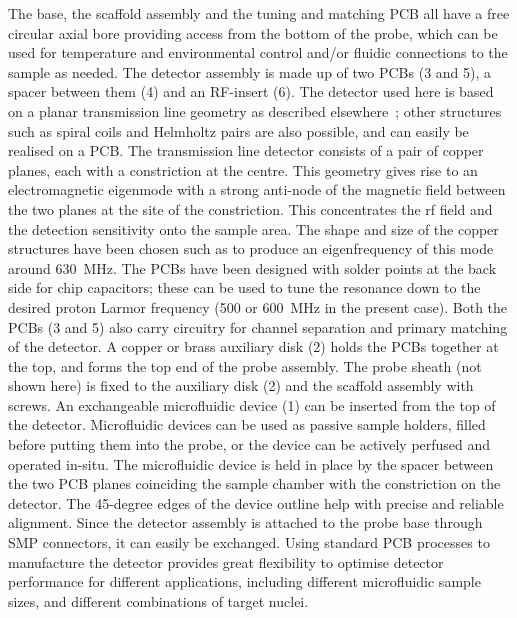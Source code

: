 \documentclass[preprint,5p]{elsarticle}
\begin{document}
The base, the scaffold assembly and the tuning and matching PCB all have a free circular 
axial bore providing access from the bottom of the probe, which can be used for 
temperature and environmental control and/or fluidic connections to the sample as
needed.
The detector assembly is made up of two PCBs (3 and 5), a spacer between them (4) and an 
RF-insert (6). The detector used here is based on a planar transmission line geometry 
as described elsewhere~\cite{gream_2016,stripline_jan}; other structures such as spiral
coils and Helmholtz pairs are also possible, and can easily be realised on a PCB.
The transmission line detector consists of a pair of copper 
planes, each with a constriction at the centre.  This geometry gives rise to an 
electromagnetic eigenmode with a strong anti-node of the magnetic field between
the two planes at the site of the constriction. This concentrates the rf field 
and the detection sensitivity
onto the sample area. 
The shape and size of the copper structures have been chosen such as to produce
an eigenfrequency of this mode around 630~MHz. The PCBs have been designed with
solder points at the back side for chip capacitors; these can be used to tune the
resonance down to the desired proton Larmor frequency (500 or 600~MHz in the present case).
Both the PCBs (3 and 5) also carry circuitry for channel separation and primary 
matching of the detector. A copper or brass auxiliary disk (2) holds the PCBs 
together at the top, and forms the top end of the probe assembly.
The probe sheath (not shown here) is fixed to the auxiliary disk (2) 
and the scaffold assembly with screws. 
An exchangeable microfluidic device (1) can be inserted from the top of the detector. 
Microfluidic devices can be used as passive sample holders, filled before putting them
into the probe,
or the device can be actively perfused and operated in-situ. 
The microfluidic device is held in place by the spacer 
between the two PCB planes coinciding the sample chamber with the constriction on the 
detector.  The 45-degree edges of the device outline help with precise and reliable
alignment. 
Since the detector assembly is attached to the probe base through SMP 
connectors, it can easily be exchanged. 
Using standard PCB processes to manufacture the detector provides great flexibility
to optimise detector performance for different applications, including different
microfluidic sample sizes, and different combinations of target nuclei.
\par
\end{document}
